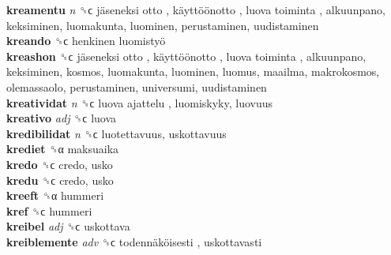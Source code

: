 \textbf{kreamentu} \emph{n}  ␝ϲ   jäseneksi otto ,  käyttöönotto ,  luova toiminta , alkuunpano, keksiminen, luomakunta, luominen, perustaminen, uudistaminen  \\
\textbf{kreando} ␝ϲ   henkinen luomistyö   \\
\textbf{kreashon} ␝ϲ   jäseneksi otto ,  käyttöönotto ,  luova toiminta , alkuunpano, keksiminen, kosmos, luomakunta, luominen, luomus, maailma, makrokosmos, olemassaolo, perustaminen, universumi, uudistaminen  \\
\textbf{kreatividat} \emph{n}  ␝ϲ   luova ajattelu , luomiskyky, luovuus  \\
\textbf{kreativo} \emph{adj}  ␝ϲ  luova  \\
\textbf{kredibilidat} \emph{n}  ␝ϲ  luotettavuus, uskottavuus  \\
\textbf{krediet} ␝α  maksuaika  \\
\textbf{kredo} ␝ϲ  credo, usko  \\
\textbf{kredu} ␝ϲ  credo, usko  \\
\textbf{kreeft} ␝α  hummeri  \\
\textbf{kref} ␝ϲ  hummeri  \\
\textbf{kreibel} \emph{adj}  ␝ϲ  uskottava  \\
\textbf{kreiblemente} \emph{adv}  ␝ϲ   todennäköisesti , uskottavasti  \\
